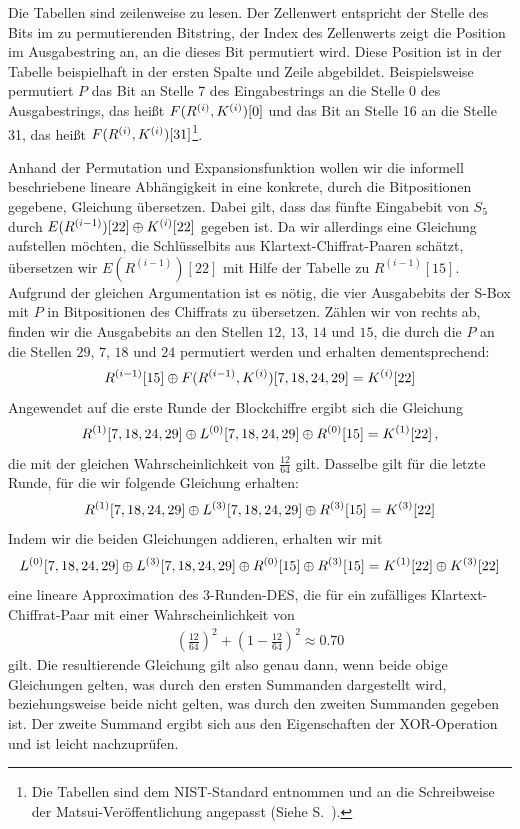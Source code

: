 Die Tabellen sind zeilenweise zu lesen. Der Zellenwert entspricht der Stelle des Bits im zu permutierenden Bitstring, der Index des Zellenwerts zeigt die Position im Ausgabestring an, an die dieses Bit permutiert wird. Diese Position ist in der Tabelle beispielhaft in  der ersten Spalte und Zeile abgebildet. Beispielsweise permutiert $P$ das Bit an Stelle 7 des Eingabestrings an die Stelle 0 des Ausgabestrings, das heißt $F(R^{(i)}, K^{(i)})[0]$ und das Bit an Stelle 16 an die Stelle 31, das heißt $F(R^{(i)}, K^{(i)})[31]$\footnote{Die Tabellen sind dem NIST-Standard \cite{NIST_DES99} entnommen und an die Schreibweise der Matsui-Veröffentlichung angepasst (Siehe S.~\pageref{matsui-notation}).}.

Anhand der Permutation und Expansionsfunktion wollen wir die informell beschriebene lineare Abhängigkeit in eine konkrete, durch die Bitpositionen gegebene, Gleichung übersetzen. Dabei gilt, dass das fünfte Eingabebit von $S_5$ durch $E(R^{(i-1)})[22] \oplus K^{(i)}[22]$ gegeben ist. Da wir allerdings eine Gleichung aufstellen möchten, die Schlüsselbits aus Klartext-Chiffrat-Paaren schätzt, übersetzen wir $E(R^{(i-1)})[22]$ mit Hilfe der Tabelle zu $R^{(i-1)}[15]$. Aufgrund der gleichen Argumentation ist es nötig, die vier Ausgabebits der S-Box mit $P$ in Bitpositionen des Chiffrats zu übersetzen. Zählen wir von rechts ab, finden wir die Ausgabebits an den Stellen $12$, $13$, $14$ und $15$, die durch die $P$ an die Stellen $29$, $7$, $18$ und $24$ permutiert werden und erhalten dementsprechend:
\begin{equation}
	R^{(i-1)}[15] \oplus F(R^{(i-1)},K^{(i)})[7,18,24,29] = K^{(i)}[22]
	\label{s5relation}
\end{equation}
Angewendet auf die erste Runde der Blockchiffre ergibt sich die Gleichung
\begin{equation*}
	R^{(1)}[7,18,24,29] \oplus L^{(0)}[7,18,24,29] \oplus R^{(0)}[15] = K^{(1)}[22]\, ,
\end{equation*}
die mit der gleichen Wahrscheinlichkeit von $\frac{12}{64}$ gilt. Dasselbe gilt für die letzte Runde, für die wir folgende Gleichung erhalten:
\begin{equation*}
	R^{(1)}[7,18,24,29] \oplus L^{(3)}[7,18,24,29] \oplus R^{(3)}[15] = K^{(3)}[22]
\end{equation*}
Indem wir die beiden Gleichungen addieren, erhalten wir mit
\begin{equation}
	L^{(0)}[7,18,24,29] \oplus L^{(3)}[7,18,24,29] \oplus R^{(0)}[15] \oplus R^{(3)}[15] = K^{(1)}[22] \oplus K^{(3)}[22]
	\label{3roundsapprox}
\end{equation}
eine lineare Approximation des $3$-Runden-DES, die für ein zufälliges Klartext-Chiffrat-Paar mit einer Wahrscheinlichkeit von
\begin{align*}
	\left(\frac{12}{64}\right)^{2}+\left(1-\frac{12}{64}\right)^{2} \approx 0.70
\end{align*}
gilt. Die resultierende Gleichung gilt also genau dann, wenn beide obige Gleichungen gelten, was durch den ersten Summanden dargestellt wird, beziehungsweise beide nicht gelten, was durch den zweiten Summanden gegeben ist. Der zweite Summand ergibt sich aus den Eigenschaften der XOR-Operation und ist leicht nachzuprüfen.

